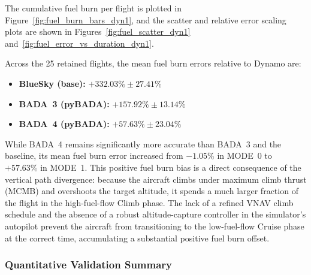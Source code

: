 The cumulative fuel burn per flight is plotted in Figure~\ref{fig:fuel_burn_bars_dyn1}, and the scatter and relative error scaling plots are shown in Figures~\ref{fig:fuel_scatter_dyn1} and~\ref{fig:fuel_error_vs_duration_dyn1}.

Across the 25 retained flights, the mean fuel burn errors relative to Dynamo are:
\begin{itemize}
    \item \textbf{BlueSky (base):} $+332.03\% \pm 27.41\%$
    \item \textbf{BADA~3 (pyBADA):} $+157.92\% \pm 13.14\%$
    \item \textbf{BADA~4 (pyBADA):} $+57.63\% \pm 23.04\%$
\end{itemize}

While BADA~4 remains significantly more accurate than BADA~3 and the baseline, its mean fuel burn error increased from $-1.05\%$ in MODE~0 to $+57.63\%$ in MODE~1. This positive fuel burn bias is a direct consequence of the vertical path divergence: because the aircraft climbs under maximum climb thrust (MCMB) and overshoots the target altitude, it spends a much larger fraction of the flight in the high-fuel-flow Climb phase. The lack of a refined VNAV climb schedule and the absence of a robust altitude-capture controller in the simulator's autopilot prevent the aircraft from transitioning to the low-fuel-flow Cruise phase at the correct time, accumulating a substantial positive fuel burn offset.

\subsubsection{Quantitative Validation Summary}

